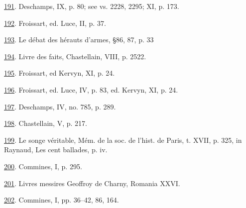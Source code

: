 \protect\hypertarget{23_NOTES.xhtmlux5cux23id_1556}{\protect\hyperlink{10_Chapter_Three__THE_HEROIC_DREAM.xhtmlux5cux23id_1555}{191}}.
Deschamps, IX, p. 80; see vs. 2228, 2295; XI, p. 173.

\protect\hypertarget{23_NOTES.xhtmlux5cux23id_1554}{\protect\hyperlink{10_Chapter_Three__THE_HEROIC_DREAM.xhtmlux5cux23id_1553}{192}}.
Froissart, ed. Luce, II, p. 37.

\protect\hypertarget{23_NOTES.xhtmlux5cux23id_1552}{\protect\hyperlink{10_Chapter_Three__THE_HEROIC_DREAM.xhtmlux5cux23id_1551}{193}}.
Le débat des hérauts d'armes, §86, 87, p. 33

\protect\hypertarget{23_NOTES.xhtmlux5cux23id_1550}{\protect\hyperlink{10_Chapter_Three__THE_HEROIC_DREAM.xhtmlux5cux23id_1549}{194}}.
Livre des faits, Chastellain, VIII, p. 2522.

\protect\hypertarget{23_NOTES.xhtmlux5cux23id_1548}{\protect\hyperlink{10_Chapter_Three__THE_HEROIC_DREAM.xhtmlux5cux23id_1547}{195}}.
Froissart, ed Kervyn, XI, p. 24.

\protect\hypertarget{23_NOTES.xhtmlux5cux23id_1546}{\protect\hyperlink{10_Chapter_Three__THE_HEROIC_DREAM.xhtmlux5cux23id_1545}{196}}.
Froissart, ed. Luce, IV, p. 83, ed. Kervyn, XI, p. 24.

\protect\hypertarget{23_NOTES.xhtmlux5cux23id_1544}{\protect\hyperlink{10_Chapter_Three__THE_HEROIC_DREAM.xhtmlux5cux23id_1543}{197}}.
Deschamps, IV, no. 785, p. 289.

\protect\hypertarget{23_NOTES.xhtmlux5cux23id_1542}{\protect\hyperlink{10_Chapter_Three__THE_HEROIC_DREAM.xhtmlux5cux23id_1541}{198}}.
Chastellain, V, p. 217.

\protect\hypertarget{23_NOTES.xhtmlux5cux23id_1540}{\protect\hyperlink{10_Chapter_Three__THE_HEROIC_DREAM.xhtmlux5cux23id_1539}{199}}.
Le songe véritable, Mém. de la soc. de l'hist. de Paris, t. XVII, p.
325, in Raynaud, Les cent ballades, p. iv.

\protect\hypertarget{23_NOTES.xhtmlux5cux23id_1538}{\protect\hyperlink{10_Chapter_Three__THE_HEROIC_DREAM.xhtmlux5cux23id_1537}{200}}.
Commines, I, p. 295.

\protect\hypertarget{23_NOTES.xhtmlux5cux23id_1536}{\protect\hyperlink{10_Chapter_Three__THE_HEROIC_DREAM.xhtmlux5cux23id_1535}{201}}.
Livres messires Geoffroy de Charny, Romania XXVI.

\protect\hypertarget{23_NOTES.xhtmlux5cux23id_1534}{\protect\hyperlink{10_Chapter_Three__THE_HEROIC_DREAM.xhtmlux5cux23id_1533}{202}}.
Commines, I, pp. 36--42, 86, 164.

